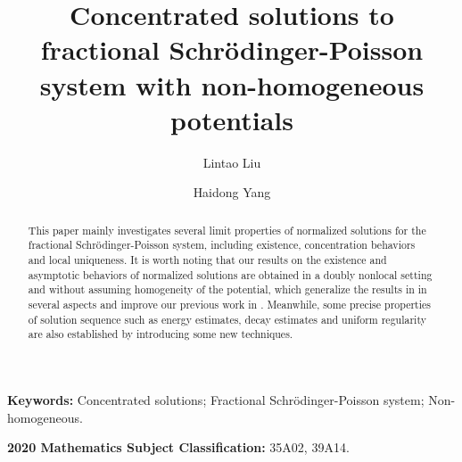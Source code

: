 \documentclass[reqno, 11pt]{amsart} %
\numberwithin{equation}{section}
\begin{document}
	
	
	
	
	\title[Concentrated solutions to fractional]{Concentrated solutions to fractional Schr\"{o}dinger-Poisson system with non-homogeneous potentials}
	
	\author{Lintao Liu}
	\address[Lintao Liu]{Department of Mathematics, North University of China, Taiyuan 030051, Shanxi, PR China}
	
	
	
	\author{Haidong Yang}
	\address[Haidong Yang]{School of Mathematics and Statistics, Central South
		University, Changsha, Hunan, PR China}
	
	
	\maketitle
	
	
	\begin{abstract}
		This paper mainly investigates several limit properties of normalized solutions for the fractional Schr\"{o}dinger-Poisson system, including existence, concentration behaviors and local uniqueness. It is worth noting that our results on the existence and asymptotic behaviors of normalized solutions are obtained in a doubly nonlocal setting and without assuming homogeneity of the potential, which generalize the results in \cite{GDCDS} in several aspects and improve our previous work in \cite{LIUYANG}. Meanwhile, some precise properties of solution sequence such as energy estimates, decay estimates and uniform regularity are also established by introducing some new techniques.
		
	\end{abstract}
	\textbf{Keywords:} Concentrated solutions; Fractional Schr\"{o}dinger-Poisson system; Non-homogeneous.
	
	\textbf{2020 Mathematics Subject Classification:} 35A02, 39A14.
	
	
	
\end{document}
